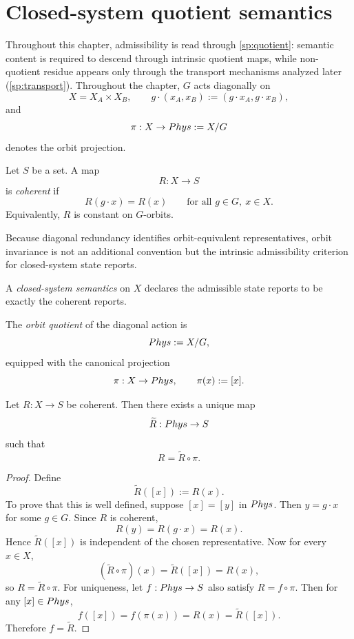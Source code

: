 \section{Closed-system quotient semantics}
\label{sec:closed-quotient}
Throughout this chapter, admissibility is read through
\cref{sp:quotient}: semantic content is required to descend through
intrinsic quotient maps, while non-quotient residue appears only through
the transport mechanisms analyzed later (\cref{sp:transport}).
Throughout the chapter, \(G\) acts diagonally on
\[
	X=X_A\times X_B,
	\qquad
	g\cdot(x_A,x_B):=(g\cdot x_A,g\cdot x_B),
\]
and
\[
	\pi:X\to Phys:=X/G
\]
denotes the orbit projection.
\begin{definition}
	\label{def:report-coherence}
	Let \(S\) be a set. A map
	\[
		R:X\to S
	\]
	is \emph{coherent} if
	\[
		R(g\cdot x)=R(x)
		\qquad
		\text{for all }g\in G,\ x\in X.
	\]
	Equivalently, \(R\) is constant on \(G\)-orbits.
\end{definition}
Because diagonal redundancy identifies orbit-equivalent representatives,
orbit invariance is not an additional convention but the intrinsic
admissibility criterion for closed-system state reports.
\begin{definition}
	\label{def:closed-system-semantics}
	A \emph{closed-system semantics} on \(X\) declares the admissible
	state reports to be exactly the coherent reports.
\end{definition}
\begin{definition}
	The \emph{orbit quotient} of the diagonal action is
	\[
		Phys:=X/G,
	\]
	equipped with the canonical projection
	\[
		\pi:X\to Phys,
		\qquad
		\pi(x):=[x].
	\]
\end{definition}
\begin{theorem}
	\label{thm:descent}
	Let \(R:X\to S\) be coherent. Then there exists a unique map
	\[
		\widetilde R:Phys\to S
	\]
	such that
	\[
		R=\widetilde R\circ \pi.
	\]
\end{theorem}
\begin{proof}
	Define
	\[
		\widetilde R([x]):=R(x).
	\]
	To prove that this is well defined, suppose \([x]=[y]\) in \(Phys\).
	Then \(y=g\cdot x\) for some \(g\in G\). Since \(R\) is coherent,
	\[
		R(y)=R(g\cdot x)=R(x).
	\]
	Hence \(\widetilde R([x])\) is independent of the chosen representative.
	Now for every \(x\in X\),
	\[
		(\widetilde R\circ\pi)(x)
		=
		\widetilde R([x])
		=
		R(x),
	\]
	so \(R=\widetilde R\circ\pi\).
	For uniqueness, let \(f:Phys\to S\) also satisfy \(R=f\circ\pi\). Then
	for any \([x]\in Phys\),
	\[
		f([x])=f(\pi(x))=R(x)=\widetilde R([x]).
	\]
	Therefore \(f=\widetilde R\).
\end{proof}
